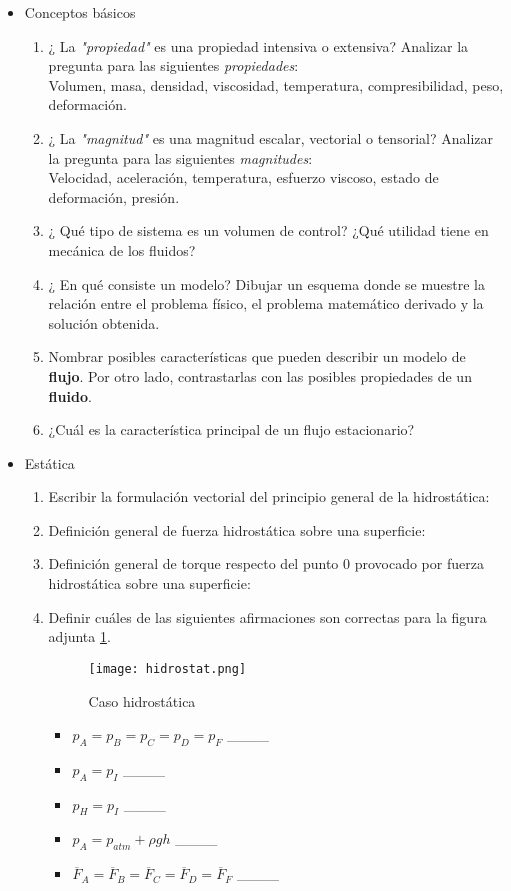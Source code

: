 \begin{itemize}
\item Conceptos básicos 
    \begin{enumerate}
    \item ¿ La {\it "propiedad"} es una propiedad intensiva o extensiva? Analizar la pregunta para las siguientes {\it propiedades}:\\
    Volumen, masa, densidad, viscosidad, temperatura, compresibilidad, peso, deformación.
    \item ¿ La {\it "magnitud"} es una magnitud escalar, vectorial o tensorial? Analizar la pregunta para las siguientes {\it magnitudes}:\\
    Velocidad, aceleración, temperatura, esfuerzo viscoso, estado de deformación, presión.
    \item ¿ Qué tipo de sistema es un volumen de control? ¿Qué utilidad tiene en mecánica de los fluidos?
    \item ¿ En qué consiste un modelo? Dibujar un esquema donde se muestre la relación entre
    el problema físico, el problema matemático derivado y la solución obtenida.
    \item Nombrar posibles características que pueden describir un modelo de {\bf flujo}. Por otro lado, contrastarlas con las
    posibles propiedades de un {\bf fluido}.
    \item ¿Cuál es la característica principal de un flujo estacionario?
    \end{enumerate}
    
  \item Estática
    \begin{enumerate}
    \item Escribir la formulación vectorial del principio general de la hidrostática:
    \item Definición general de fuerza hidrostática sobre una superficie:
    \item Definición general de torque respecto del punto $0$ provocado por fuerza hidrostática sobre una superficie:
    \item Definir cuáles de las siguientes afirmaciones son correctas para la figura adjunta \ref{fig:hidrostat}.

      \begin{figure}[!ht]
      \centering
      \texttt{[image: hidrostat.png]}
      \caption{Caso hidrostática}
      \label{fig:hidrostat}
      \end{figure}

      \begin{itemize}
      \item $p_A = p_B= p_C= p_D= p_F$ \_\_\_\_
      \item $p_A = p_I$ \_\_\_\_
      \item $p_H = p_I$ \_\_\_\_
      \item $p_A = p_{atm}+\rho g h$ \_\_\_\_
      \item $\overline{F}_A = \overline{F}_B= \overline{F}_C= \overline{F}_D= \overline{F}_F$ \_\_\_\_
      \end{itemize}
      

\end{enumerate}
\end{itemize}
